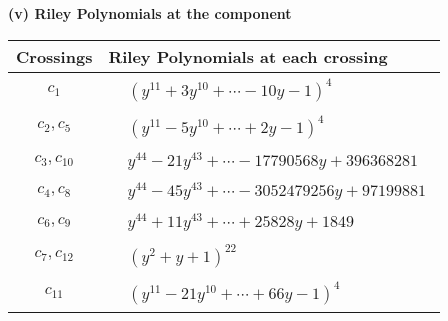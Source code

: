 \documentclass[1p]{elsarticle_modified}
\theoremstyle{definition}
\begin{document}
\newpage\renewcommand{\arraystretch}{1}
\flushleft \textbf{(v) Riley Polynomials at the component}\newline \\
\begin{tabular}{m{50pt}|m{274pt}}
Crossings & \hspace{64pt}Riley Polynomials at each crossing \\
\hline $$\begin{aligned}c_{1}\end{aligned}$$&$\begin{aligned}
&(y^{11}+3 y^{10}+\cdots-10 y-1)^{4}
\end{aligned}$\\
\hline $$\begin{aligned}c_{2},c_{5}\end{aligned}$$&$\begin{aligned}
&(y^{11}-5 y^{10}+\cdots+2 y-1)^{4}
\end{aligned}$\\
\hline $$\begin{aligned}c_{3},c_{10}\end{aligned}$$&$\begin{aligned}
&y^{44}-21 y^{43}+\cdots-17790568 y+396368281
\end{aligned}$\\
\hline $$\begin{aligned}c_{4},c_{8}\end{aligned}$$&$\begin{aligned}
&y^{44}-45 y^{43}+\cdots-3052479256 y+97199881
\end{aligned}$\\
\hline $$\begin{aligned}c_{6},c_{9}\end{aligned}$$&$\begin{aligned}
&y^{44}+11 y^{43}+\cdots+25828 y+1849
\end{aligned}$\\
\hline $$\begin{aligned}c_{7},c_{12}\end{aligned}$$&$\begin{aligned}
&(y^2+y+1)^{22}
\end{aligned}$\\
\hline $$\begin{aligned}c_{11}\end{aligned}$$&$\begin{aligned}
&(y^{11}-21 y^{10}+\cdots+66 y-1)^{4}
\end{aligned}$\\
\hline
\end{tabular}\\~\\
\end{document}
